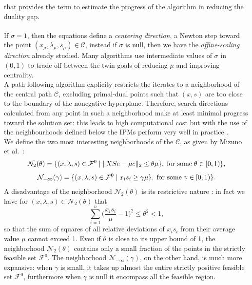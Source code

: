 \documentclass[a4paper,10 pt,titlepage,twoside]{report}
\theoremstyle{plain}
\theoremstyle{definition}
\theoremstyle{remark}
\begin{document}
 that provides the term to estimate the progress of the
 algorithm in reducing the duality gap.\\  
 \\
If $\sigma = 1$, then the equations define a \textit{centering direction}, a Newton step toward the point $(x_{\mu},\lambda_{\mu}, s_{\mu})\in\mathcal{C}$, instead if $\sigma$ is null, then we have the \textit{affine-scaling direction} already studied. Many algorithms use intermediate values of $\sigma$ in $(0,1)$ to trade off between the twin goals of reducing $\mu$ and improving centrality. 
\\ A path-following algorithm explicity restricts the iterates to a neighborhood of the central path $\mathcal{C}$, excluding primal-dual points such that $(x, s)$ are too close to the boundary of the nonegative hyperplane. Therefore, search directions calculated from any point in such a neighborhood make at least minimal progress toward the solution set: this leads to high computational cost but with the use of the neighbourhoods defined below the IPMs perform
very well in practice \cite{25y}.\\
 We define the two most interesting neighborhoods of the $\mathcal{C}$, as given
by Mizuno et al.~\cite{5}:\\
\begin{equation*}
\mathcal{N}_{2}(\theta) =\{(x, \lambda,s)\in\mathcal{F}^{0} \;|\;\lVert XSe - \mu e \rVert_{2} \leq \theta \mu \}, \text{\;for some\;} \theta \in [0,1)\},
\end{equation*} 
\begin{equation*}
\mathcal{N}_{-\infty}(\gamma) =\{ (x, \lambda,s)\in\mathcal{F}^{0} \;|\; x_{i}s_{i} \geq \gamma \mu \}, \text{\;for some\;} \gamma \in [0,1)\}.
\end{equation*} 
A disadvantage of the neighborhood $\mathcal{N}_{2}(\theta)$ is its restrictive nature \cite{W}:  in fact we have for $(x, \lambda,s)\in\mathcal{N}_{2}(\theta)$ that
\begin{equation*}
\sum\limits_{i=1}^{n}\bigg(\frac{x_{i}s_{i}}{\mu}-1\bigg)^{2}\leq \theta^{2}<1,
\end{equation*} 
so that the sum of squares of all relative deviations of $x_{i}s_{i}$ from their average value $\mu$ cannot exceed 1. Even if $\theta$ is close to its upper bound of 1, the neighborhood $\mathcal{N}_{2}(\theta)$ contains only a small fraction of the points in the strictly feasible set $\mathcal{F}^{0}$. The neighborhood $\mathcal{N}_{-\infty}(\gamma)$, on the other hand, is much more expansive: when $\gamma$ is small, it takes up almost the entire strictly positive feasible set $\mathcal{F}^{0}$, furthermore when $\gamma$ is null it encompass all the
feasible region.
\end{document}
